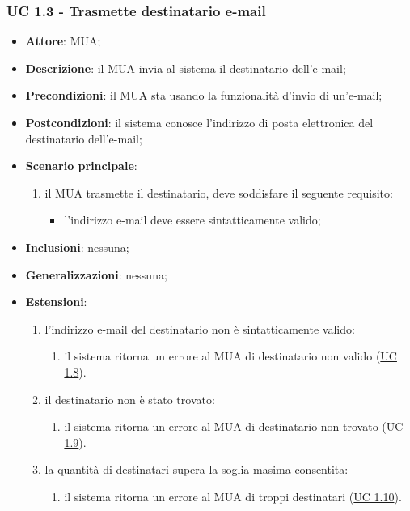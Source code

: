     \subsubsection{UC 1.3 - Trasmette destinatario e-mail} \label{sec:UC1.3}
    \begin{itemize}
        \item \textbf{Attore}: MUA;
        \item \textbf{Descrizione}: il MUA invia al sistema il destinatario dell'e-mail;
        \item \textbf{Precondizioni}: il MUA sta usando la funzionalità d'invio di un'e-mail;
        \item \textbf{Postcondizioni}: il sistema conosce l'indirizzo di posta elettronica del destinatario dell'e-mail;
        \item \textbf{Scenario principale}:
            \begin{enumerate}
                \item il MUA trasmette il destinatario, deve soddisfare il seguente requisito:
                    \begin{itemize}
                        \item l'indirizzo e-mail deve essere sintatticamente valido;
                    \end{itemize}
            \end{enumerate}
        \item \textbf{Inclusioni}: nessuna;
        \item \textbf{Generalizzazioni}: nessuna;
        \item \textbf{Estensioni}:
            \begin{enumerate}[label=\alph*.]
                \item l'indirizzo e-mail del destinatario non è sintatticamente valido:
                \begin{enumerate}[label=\arabic*.]
                    \item il sistema ritorna un errore al MUA di destinatario non valido (\hyperref[sec:UC1.8]{UC 1.8}).
                \end{enumerate}
                \item il destinatario non è stato trovato:
                \begin{enumerate}[label=\arabic*.]
                    \item il sistema ritorna un errore al MUA di destinatario non trovato (\hyperref[sec:UC1.9]{UC 1.9}).
                \end{enumerate}
                \item la quantità di destinatari supera la soglia masima consentita:
                \begin{enumerate}[label=\arabic*.]
                    \item il sistema ritorna un errore al MUA di troppi destinatari (\hyperref[sec:UC1.10]{UC 1.10}).
                \end{enumerate}
            \end{enumerate}
    \end{itemize}


